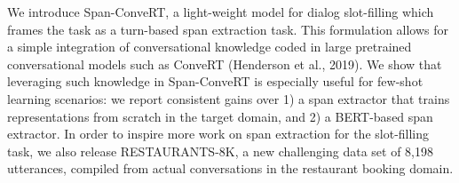 We introduce Span-ConveRT, a light-weight model for dialog slot-filling which frames the task as a turn-based span extraction task. This formulation allows for a simple integration of conversational knowledge coded in large pretrained conversational models such as ConveRT (Henderson et al., 2019). We show that leveraging such knowledge in Span-ConveRT is especially useful for few-shot learning scenarios: we report consistent gains over 1) a span extractor that trains representations from scratch in the target domain, and 2) a BERT-based span extractor. In order to inspire more work on span extraction for the slot-filling task, we also release RESTAURANTS-8K, a new challenging data set of 8,198 utterances, compiled from actual conversations in the restaurant booking domain.
